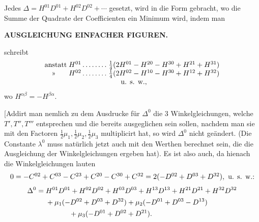 Jedes \(\Delta=H^{01}D^{01}+H^{02}D^{02}+\cdots\) gesetzt, wird in die Form gebracht, wo die Summe der Quadrate der Coefficienten ein Minimum wird, indem man

\par\clearpage
\noindent\null\hfill{\small\textbf{AUSGLEICHUNG EINFACHER FIGUREN.}}\hfill{}\par\medskip

\noindent schreibt
\[
\begin{array}{@{}l@{\;}l@{\;}l@{}}
 \text{anstatt}&
 H^{01}\,.\,.\,.\,.\,.\,.\,.\,.&
 \tfrac14(2H^{01}-H^{20}-H^{30}+H^{21}+H^{31})\\
 \text{\quad»}&
 H^{02}\,.\,.\,.\,.\,.\,.\,.\,.&
 \tfrac14(2H^{02}-H^{10}-H^{30}+H^{12}+H^{32})\\
 \multicolumn{3}{c@{}}{\text{u. s. w.,}}
\end{array}
\]
\noindent wo \(H^{\alpha\beta}=-H^{\beta\alpha}\).

[Addirt man nemlich zu dem Ausdrucke für \(\Delta^0\) die 3 Winkelgleichungen, welche \(T',T'',T'''\) entsprechen und die bereits ausgeglichen sein sollen, nachdem man sie mit den Factoren \(\tfrac12\mu_1,\tfrac12\mu_2,\tfrac12\mu_3\) multiplicirt hat, so wird \(\Delta^0\) nicht geändert. (Die Constante \(\lambda^0\) muss natürlich jetzt auch mit den Werthen berechnet sein, die die Ausgleichung der Winkelgleichungen ergeben hat). Es ist also auch, da hienach die Winkelgleichungen lauten
\[
 \resizebox{\linewidth}{!}{\(0=-C^{02}+C^{03}-C^{23}+C^{20}-C^{30}+C^{32}
 =2(-D^{02}+D^{03}+D^{32}),\ \text{u. s. w.:}\)}
\]
\[
\begin{aligned}
 \Delta^0={}&H^{01}D^{01}+H^{02}D^{02}+H^{03}D^{03}
             +H^{13}D^{13}+H^{21}D^{21}+H^{32}D^{32}\\
 &+\mu_1(-D^{02}+D^{03}+D^{32})+\mu_2(-D^{01}+D^{03}-D^{13})\\
 &\hspace{3.3em}+\mu_3(-D^{01}+D^{02}+D^{21}).
\end{aligned}
\]


